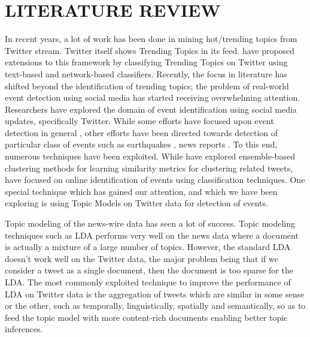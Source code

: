 \section{\uppercase{Literature Review}}
In recent years, a lot of work has been done in mining hot/trending topics from Twitter stream. Twitter itself shows Trending Topics in its feed. \cite{lee2011twitter} have proposed extensions to this framework by classifying Trending Topics on Twitter using text-based and network-based classifiers. Recently, the focus in literature has shifted beyond the identification of trending topics; the problem of real-world event detection using social media has started receiving overwhelming attention. Researchers have explored the domain of event identification using social media updates, specifically Twitter. While some efforts have focused upon event detection in general \cite{becker2010learning}, other efforts have been directed towards detection of particular class of events such as earthquakes \cite{sakaki2010earthquake}, news reports \cite{sankaranarayanan2009twitterstand}. To this end, numerous techniques have been exploited. While \cite{becker2010learning} have explored ensemble-based clustering methods for learning similarity metrics for clustering related tweets, \cite{becker2011beyond} have focused on online identification of events using classification techniques. One special technique which has gained our attention, and which we have been exploring is using Topic Models on Twitter data for detection of events.

Topic modeling of the news-wire data has seen a lot of success. Topic modeling techniques such as LDA performs very well on the news data where a document is actually a mixture of a large number of topics. However, the standard LDA doesn't work well on the Twitter data, the major problem being that if we consider a tweet as a single document, then the document is too sparse for the LDA. The most commonly exploited technique to improve the performance of LDA on Twitter data is the aggregation of tweets which are similar in some sense or the other, such as temporally, linguistically, spatially and semantically, so as to feed the topic model with more content-rich documents enabling better topic inferences.

